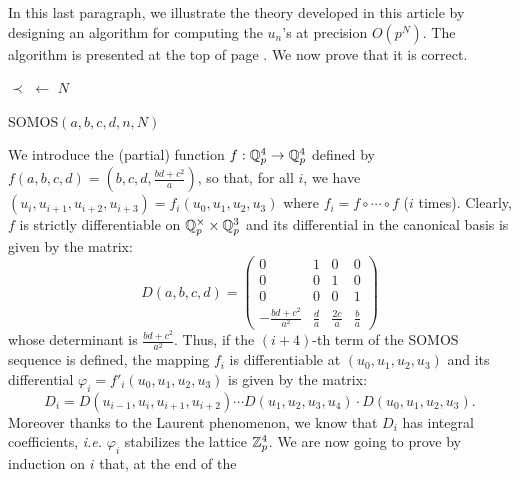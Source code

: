 \documentclass{amsart}
\begin{document}
In this last paragraph, we illustrate the theory developed in this 
article by designing an algorithm for computing the $u_n$'s at precision 
$O(p^N)$. The algorithm is presented at the top of page 
\pageref{algo:SOMOS}. We now prove that it is correct.
%
\begin{algorithm}[t]
\BlankLine
$\prec$ $\leftarrow$ $N$\;
\;
\caption{\sc SOMOS$(a, b, c, d, n, N)$}\label{algo:SOMOS}
\end{algorithm}
%
We introduce the (partial) function $f : \mathbb Q_p^4 \to \mathbb Q_p^4$ defined by 
$f(a,b,c,d) = (b,c,d,\frac{bd+c^2}a)$, so that, for all $i$, we have 
$(u_i, u_{i+1}, u_{i+2}, u_{i+3}) = f_i(u_0, u_1, u_2, u_3)$ where $f_i
= f \circ \cdots \circ f$ ($i$ times). Clearly, $f$ is strictly 
differentiable on $\mathbb Q_p^\times \times \mathbb Q_p^3$ and its differential in the 
canonical basis is given by the matrix:
$$D(a,b,c,d) = \begin{pmatrix}
0 & 1 & 0 & 0 \\
0 & 0 & 1 & 0 \\
0 & 0 & 0 & 1 \\
-\frac{bd+c^2}{a^2} & \frac d a & \frac {2c} a & \frac b a
\end{pmatrix}$$
whose determinant is $\frac{bd+c^2}{a^2}$. Thus, if the $(i+4)$-th term 
of the SOMOS sequence is defined, the mapping $f_i$ is differentiable
at $(u_0, u_1, u_2, u_3)$ and its differential $\varphi_i = 
f'_i(u_0, u_1, u_2, u_3)$ is given by the matrix:
$$D_i = D(u_{i-1}, u_i, u_{i+1}, u_{i+2}) \cdots
D(u_1, u_2, u_3, u_4) \cdot D(u_0, u_1, u_2, u_3).$$
Moreover thanks to the Laurent phenomenon, we know that $D_i$ has
integral coefficients, \emph{i.e.} $\varphi_i$ stabilizes the lattice
$\mathbb Z_p^4$.
We are now going to prove by induction on $i$ that, at the end of the 
\end{document}
